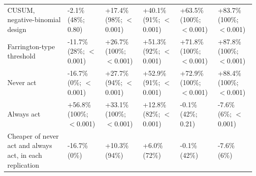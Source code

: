 \begin{landscape}
\begin{minipage}{\linewidth}
\begin{tabular}{llllll}
CUSUM, negative-binomial design & -2.1\% (48\%; 0.80) & +17.4\% (98\%; $<$0.001) & +40.1\% (91\%; $<$0.001) & +63.5\% (100\%; $<$0.001) & +83.7\% (100\%; $<$0.001) \\
Farrington-type threshold & -11.7\% (28\%; $<$0.001) & +26.7\% (100\%; $<$0.001) & +51.3\% (92\%; $<$0.001) & +71.8\% (100\%; $<$0.001) & +87.8\% (100\%; $<$0.001) \\
Never act & -16.7\% (0\%; $<$0.001) & +27.7\% (94\%; $<$0.001) & +52.9\% (91\%; $<$0.001) & +72.9\% (100\%; $<$0.001) & +88.4\% (100\%; $<$0.001) \\
Always act & +56.8\% (100\%; $<$0.001) & +33.1\% (100\%; $<$0.001) & +12.8\% (82\%; $<$0.001) & -0.1\% (42\%; 0.21) & -7.6\% (6\%; $<$0.001) \\
Cheaper of never act and always act, in each replication & -16.7\% (0\%) & +10.3\% (94\%) & +6.0\% (72\%) & -0.1\% (42\%) & -7.6\% (6\%) \\
\bottomrule
\end{tabular}
\end{minipage}
\vspace{14pt}

\end{landscape}
